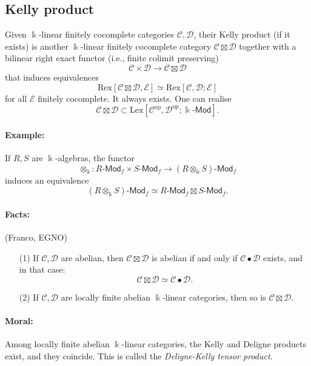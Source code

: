 \documentclass[11pt]{article}
\theoremstyle{definition}
\begin{document}
\subsection{Kelly product}
Given \( \Bbbk \)-linear finitely cocomplete categories \( \mathcal{C}, \mathcal{D} \), their Kelly product (if it exists) is another \( \Bbbk \)-linear finitely cocomplete category \( \mathcal{C} \boxtimes \mathcal{D} \) together with a bilinear right exact functor (i.e., finite colimit preserving)
\[ \mathcal{C} \times \mathcal{D} \to \mathcal{C} \boxtimes \mathcal{D} \]
that induces equivalences
\[ \mathrm{Rex}[\mathcal{C} \boxtimes \mathcal{D}, \mathcal{E}] \simeq \mathrm{Rex}[\mathcal{C} , \mathcal{D}; \mathcal{E}] \]
for all \( \mathcal{E} \) finitely cocomplete. It always exists. One can realise
\[ \mathcal{C} \boxtimes \mathcal{D} \subset \mathrm{Lex}[\mathcal{C}^{\mathrm{op}}, \mathcal{D}^{\mathrm{op}}; \Bbbk\text{-}\mathsf{Mod}]. \]

\paragraph{Example:} If \( R, S \) are \( \Bbbk \)-algebras, the functor
\[ \otimes_\Bbbk : R\text{-}\mathsf{Mod}_f \times S\text{-}\mathsf{Mod}_f \to (R \otimes_\Bbbk S)\text{-}\mathsf{Mod}_f \]
induces an equivalence
\[ (R \otimes_\Bbbk S)\text{-}\mathsf{Mod}_f \simeq R\text{-}\mathsf{Mod}_f \boxtimes S\text{-}\mathsf{Mod}_f. \]

\paragraph{Facts:} (Franco, EGNO)
\begin{itemize}
  \item[(1)] If \( \mathcal{C}, \mathcal{D} \) are abelian, then \( \mathcal{C} \boxtimes \mathcal{D} \) is abelian if and only if \( \mathcal{C} \bullet \mathcal{D} \) exists, and in that case:
  \[ \mathcal{C} \boxtimes \mathcal{D} \simeq \mathcal{C} \bullet \mathcal{D}. \]
  \item[(2)] If \( \mathcal{C}, \mathcal{D} \) are locally finite abelian \( \Bbbk \)-linear categories, then so is \( \mathcal{C} \boxtimes \mathcal{D} \).
\end{itemize}

\paragraph{Moral:} Among locally finite abelian \( \Bbbk \)-linear categories, the Kelly and Deligne products exist, and they coincide. This is called the \emph{Deligne-Kelly tensor product}.
\end{document}
